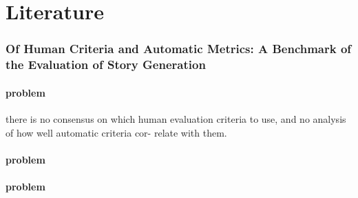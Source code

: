 \chapter{Literature}
	\label{chap:Literature}

	\subsection{Of Human Criteria and Automatic Metrics: A Benchmark of the Evaluation of Story Generation}
	\subsubsection{problem}
	there is no consensus on which human evaluation criteria to use, and
no analysis of how well automatic criteria cor-
relate with them.
	\subsubsection{problem}
	\subsubsection{problem}